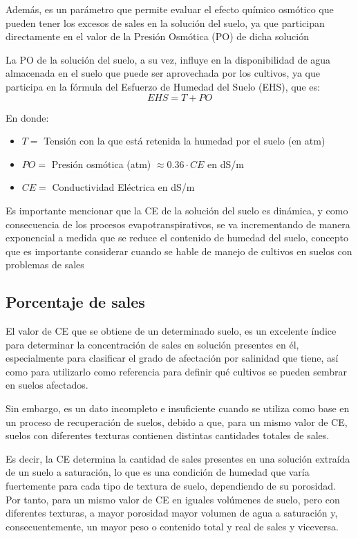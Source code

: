 Además, es un parámetro que permite evaluar el efecto químico osmótico que pueden tener los excesos de sales en la solución del suelo, ya que participan directamente en el valor de la Presión Osmótica (PO) de dicha solución

La PO de la solución del suelo, a su vez, influye en la disponibilidad de agua almacenada en el suelo que puede ser aprovechada por los cultivos, ya que participa en la fórmula del Esfuerzo de Humedad del Suelo (EHS), que es:
\begin{equation}
EHS = T + PO
\end{equation}
\begin{notation}
En donde:
\begin{itemize}
\item $T =$ Tensión con la que está retenida la humedad por el suelo (en atm)
\item $PO =$ Presión osmótica (atm) $\approx 0.36 \cdot CE$ en dS/m
\item $CE =$ Conductividad Eléctrica en dS/m
\end{itemize}
\end{notation}
Es importante mencionar que la CE de la solución del suelo es dinámica, y como
consecuencia de los procesos evapotranspirativos, se va incrementando de manera
exponencial a medida que se reduce el contenido de humedad del suelo, concepto
que es importante considerar cuando se hable de manejo de cultivos en suelos con
problemas de sales

\subsection{Porcentaje de sales}
El valor de CE que se obtiene de un determinado suelo, es un excelente índice para determinar la concentración de sales en solución presentes en él, especialmente para clasificar el grado de afectación por salinidad que tiene, así como para utilizarlo como referencia para definir qué cultivos se pueden sembrar en suelos afectados.

Sin embargo, es un dato incompleto e insuficiente cuando se utiliza como base en un proceso de recuperación de suelos, debido a que, para un mismo valor de CE, suelos con diferentes texturas contienen distintas cantidades totales de sales.

Es decir, la CE determina la cantidad de sales presentes en una solución extraída de un suelo a saturación, lo que es una condición de humedad que varía fuertemente para cada tipo de textura de suelo, dependiendo de su porosidad. Por tanto, para un mismo valor de CE en iguales volúmenes de suelo, pero con diferentes texturas, a mayor porosidad mayor volumen de agua a saturación y, consecuentemente, un mayor peso o contenido total y real de sales y viceversa.

